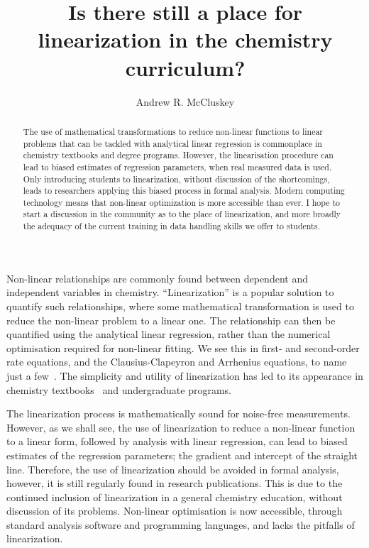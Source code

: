 \documentclass[journal=jceda8,manuscript=article]{achemso}
\author{Andrew R. McCluskey}
\affiliation{European Spallation Source ERIC, Ole Maaløes vej 3, 2200 København N, DK}
\title{Is there still a place for linearization in the chemistry curriculum?}
\begin{document}
\begin{abstract}
    The use of mathematical transformations to reduce non-linear functions to linear problems that can be tackled with analytical linear regression is commonplace in chemistry textbooks and degree programs. 
    However, the linearisation procedure can lead to biased estimates of regression parameters, when real measured data is used. 
    Only introducing students to linearization, without discussion of the shortcomings, leads to researchers applying this biased process in formal analysis.
    Modern computing technology means that non-linear optimization is more accessible than ever. 
    I hope to start a discussion in the community as to the place of linearization, and more broadly the adequacy of the current training in data handling skills we offer to students.
\end{abstract}

\maketitle 

Non-linear relationships are commonly found between dependent and independent variables in chemistry. 
``Linearization'' is a popular solution to quantify such relationships, where some mathematical transformation is used to reduce the non-linear problem to a linear one. 
The relationship can then be quantified using the analytical linear regression, rather than the numerical optimisation required for non-linear fitting. 
We see this in first- and second-order rate equations, and the Clausius-Clapeyron and Arrhenius equations, to name just a few~\cite{perrin_linear_2017,harper_data_2017,monk_math_2010}.
The simplicity and utility of linearization has led to its appearance in chemistry textbooks~\cite{monk_math_2010,atkins_physical_2018} and undergraduate programs. 

The linearization process is mathematically sound for noise-free measurements. 
However, as we shall see, the use of linearization to reduce a non-linear function to a linear form, followed by analysis with linear regression, can lead to biased estimates of the regression parameters; the gradient and intercept of the straight line. 
Therefore, the use of linearization should be avoided in formal analysis, however, it is still regularly found in research publications. 
This is due to the continued inclusion of linearization in a general chemistry education, without discussion of its problems. 
Non-linear optimisation is now accessible, through standard analysis software and programming languages, and lacks the pitfalls of linearization. 
\end{document}

